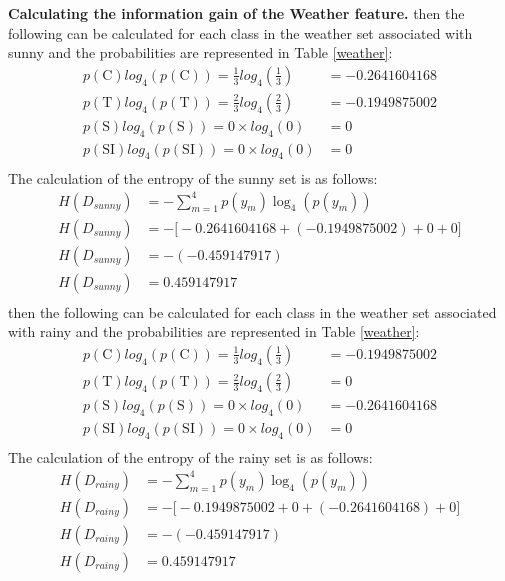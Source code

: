 \documentclass[10pt]{article}
\begin{document}
\textbf{Calculating the information gain of the Weather feature.}
then the following can be calculated for each class in the weather set associated with sunny and the probabilities
are represented in Table \ref{weather}:
\begin{align*}
    p(\text{C}) log_4 \left( p(\text{C}) \right) = \frac{1}{3} log_4 \left( \frac{1}{3} \right) &= -0.2641604168\\
    p(\text{T}) log_4 \left( p(\text{T}) \right) = \frac{2}{3} log_4 \left( \frac{2}{3} \right) &= -0.1949875002\\
    p(\text{S}) log_4 \left( p(\text{S}) \right) = 0 \times log_4 \left( 0 \right) &= 0\\
    p(\text{SI}) log_4 \left( p(\text{SI}) \right) = 0 \times log_4 \left( 0 \right) &= 0\\
\end{align*}
The calculation of the entropy of the sunny set is as follows:
\begin{align*}
    H(D_{sunny}) &= - \sum_{m=1}^{4} p(y_m) \log_4 \left( p(y_m) \right) \\
    H(D_{sunny}) &= - \big[ -0.2641604168 + (-0.1949875002) + 0 + 0\big] \\
    H(D_{sunny}) &= - (-0.459147917) \\
    H(D_{sunny}) &= 0.459147917 \\
\end{align*}
then the following can be calculated for each class in the weather set associated with rainy and the probabilities
are represented in Table \ref{weather}:
\begin{align*}
    p(\text{C}) log_4 \left( p(\text{C}) \right) = \frac{1}{3} log_4 \left( \frac{1}{3} \right) &= -0.1949875002\\
    p(\text{T}) log_4 \left( p(\text{T}) \right) = \frac{2}{3} log_4 \left( \frac{2}{3} \right) &= 0\\
    p(\text{S}) log_4 \left( p(\text{S}) \right) = 0 \times log_4 \left( 0 \right) &= -0.2641604168\\
    p(\text{SI}) log_4 \left( p(\text{SI}) \right) = 0 \times log_4 \left( 0 \right) &= 0\\
\end{align*}
The calculation of the entropy of the rainy set is as follows:
\begin{align*}
    H(D_{rainy}) &= - \sum_{m=1}^{4} p(y_m) \log_4 \left( p(y_m) \right) \\
    H(D_{rainy}) &= - \big[ -0.1949875002 + 0 + (-0.2641604168) + 0\big] \\
    H(D_{rainy}) &= - (-0.459147917) \\
    H(D_{rainy}) &= 0.459147917 \\
\end{align*}
\end{document}
